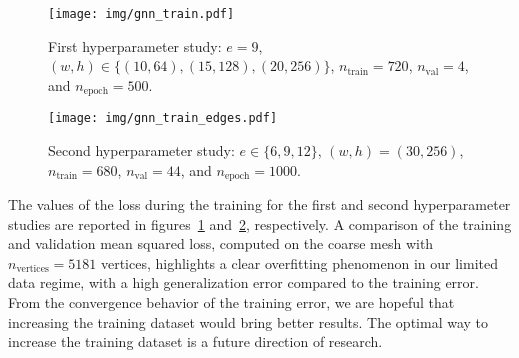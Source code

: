 \begin{figure}[!htp]
  \centering
  \texttt{[image: img/gnn\_train.pdf]}
  \caption{First hyperparameter study: $e=9$, $(w,h)\in\{(10, 64), (15, 128), (20, 256)\}$, $n_{\text{train}}=720$, $n_{\text{val}}=4$, and $n_{\text{epoch}}=500$.}
  \label{fig:overfitting}
\end{figure}

\begin{figure}[!htp]
  \centering
  \texttt{[image: img/gnn\_train\_edges.pdf]}
  \caption{Second hyperparameter study: $e\in\{6, 9, 12\}$, $(w,h)=(30, 256)$, $n_{\text{train}}=680$, $n_{\text{val}}=44$, and $n_{\text{epoch}}=1000$.}
  \label{fig:overfitting_edges}
\end{figure}

The values of the loss during the training for the first and second hyperparameter studies are reported in figures~\ref{fig:overfitting} and~\ref{fig:overfitting_edges}, respectively. A comparison of the training and validation mean squared loss, computed on the coarse mesh with $n_{\text{vertices}}=5181$ vertices, highlights a clear overfitting phenomenon in our limited data regime, with a high generalization error compared to the training error. From the convergence behavior of the training error, we are hopeful that increasing the training dataset would bring better results. The optimal way to increase the training dataset is a future direction of research.

